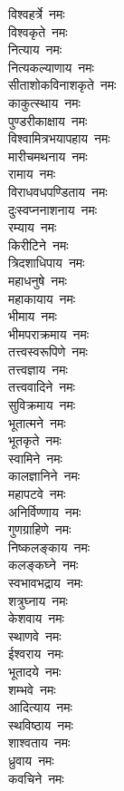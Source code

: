 \begin{multicols}{2}
\begin{flushleft}
विश्वहर्त्रे~नमः\\
विश्वकृते~नमः\\
नित्याय~नमः\hfill{}\\
नित्यकल्याणाय~नमः\\
सीताशोकविनाशकृते~नमः\\
काकुत्स्थाय~नमः\\
पुण्डरीकाक्षाय~नमः\\
विश्वामित्रभयापहाय~नमः\\
मारीचमथनाय~नमः\\
रामाय~नमः\\
विराधवधपण्डिताय~नमः\\
दुःस्वप्ननाशनाय~नमः\\
रम्याय~नमः\hfill{}\\
किरीटिने~नमः\\
त्रिदशाधिपाय~नमः\\
महाधनुषे~नमः\\
महाकायाय~नमः\\
भीमाय~नमः\\
भीमपराक्रमाय~नमः\\
तत्त्वस्वरूपिणे~नमः\\
तत्त्वज्ञाय~नमः\\
तत्त्ववादिने~नमः\\
सुविक्रमाय~नमः\hfill{}\\
भूतात्मने~नमः\\
भूतकृते~नमः\\
स्वामिने~नमः\\
कालज्ञानिने~नमः\\
महापटवे~नमः\\
अनिर्विण्णाय~नमः\\
गुणग्राहिणे~नमः\\
निष्कलङ्काय~नमः\\
कलङ्कघ्ने~नमः\\
स्वभावभद्राय~नमः\hfill{}\\
शत्रुघ्नाय~नमः\\
केशवाय~नमः\\
स्थाणवे~नमः\\
ईश्वराय~नमः\\
भूतादये~नमः\\
शम्भवे~नमः\\
आदित्याय~नमः\\
स्थविष्ठाय~नमः\\
शाश्वताय~नमः\\
ध्रुवाय~नमः\hfill{}\\
कवचिने~नमः\\

\end{flushleft}
\end{multicols}
